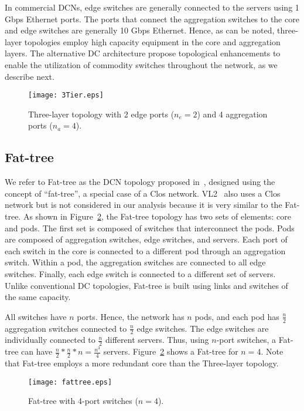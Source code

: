 In commercial DCNs, edge switches are generally connected to the servers using 1 Gbps Ethernet ports. The ports that connect the aggregation switches to the core and edge switches are generally 10 Gbps Ethernet.
Hence, as can be noted, three-layer topologies employ high capacity equipment in the core and aggregation layers. The alternative DC architecture propose topological enhancements to enable the utilization of commodity switches throughout the network, as we describe next.
\begin{figure}
\centering
\texttt{[image: 3Tier.eps]}
\caption{Three-layer topology with 2 edge ports ($n_e=2$) and 4 aggregation ports ($n_a=4$).}
\label{fig:conventional}
\end{figure}

\subsection{Fat-tree}
\label{Fat-tree}

We refer to Fat-tree as the DCN topology proposed in~\cite{al2008scalable}, designed using the concept of ``fat-tree'', a special case of a Clos network. VL2~\cite{greenberg2009vl2} also uses a Clos network but is not considered in our analysis because it is very similar to the Fat-tree. 
As shown in Figure~\ref{fig:fatTree}, the Fat-tree topology has two sets of elements: core and pods.
The first set is composed of switches that interconnect the pods. Pods are composed of aggregation switches, edge switches, and servers. Each port of each switch in the core is connected to a different pod through an aggregation switch. Within a pod, the aggregation switches are connected to all edge switches.
Finally, each edge switch is connected to a different set of servers. Unlike conventional DC topologies, Fat-tree is built using links and switches of the same capacity.

All switches have $n$ ports. Hence, the network has $n$ pods, and each pod has $\frac{n}{2}$ aggregation
switches connected to $\frac{n}{2}$ edge switches. The edge switches are individually connected to $\frac{n}{2}$ different servers. Thus, using $n$-port switches, a Fat-tree can have $\frac{n}{2}*\frac{n}{2}*n=\frac{n^3}{4}$ servers.
Figure~\ref{fig:fatTree} shows a Fat-tree for $n=4$. Note that Fat-tree employs a more redundant core than the Three-layer topology.
\begin{figure}
\centering
\texttt{[image: fattree.eps]}
\caption{Fat-tree with 4-port switches ($n=4$).}
\label{fig:fatTree}
\end{figure}

